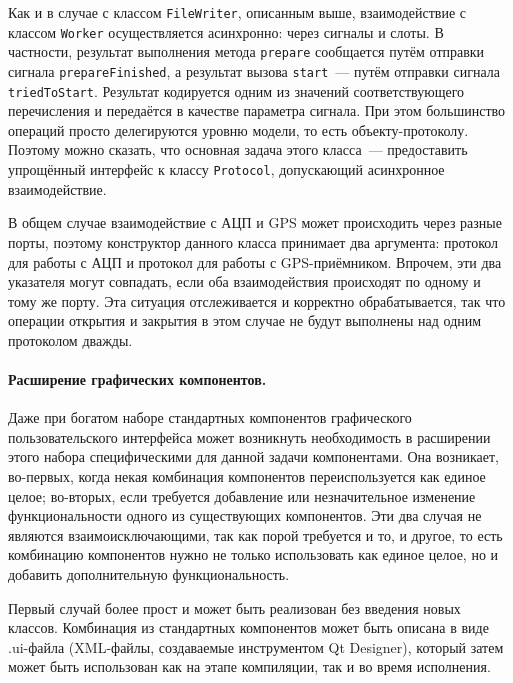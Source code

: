 \documentclass[a4paper, 14pt, titlepage]{extarticle}
\newcommand{\inlinecode}[1]{\lstinline[basicstyle=\ttfamily]{#1}}
\newcommand{\eng}[1]{\foreignlanguage{english}{#1}}
\begin{document}
  Как и в случае с классом \inlinecode{FileWriter}, описанным выше, взаимодействие с классом
  \inlinecode{Worker} осуществляется асинхронно: через сигналы и слоты. В частности, результат
  выполнения метода \inlinecode{prepare} сообщается путём отправки сигнала
  \inlinecode{prepareFinished}, а результат вызова \inlinecode{start}~--- путём отправки сигнала
  \inlinecode{triedToStart}. Результат кодируется одним из значений соответствующего перечисления и
  передаётся в качестве параметра сигнала. При этом большинство операций просто делегируются уровню
  модели, то есть объекту-протоколу. Поэтому можно сказать, что основная задача этого класса~---
  предоставить упрощённый интерфейс к классу \inlinecode{Protocol}, допускающий асинхронное
  взаимодействие.

  В общем случае взаимодействие с АЦП и GPS может происходить через разные порты, поэтому конструктор
  данного класса принимает два аргумента: протокол для работы с АЦП и протокол для работы с
  GPS-приёмником. Впрочем, эти два указателя могут совпадать, если оба взаимодействия происходят по одному и
  тому же порту. Эта ситуация отслеживается и корректно обрабатывается, так что операции открытия и
  закрытия в этом случае не будут выполнены над одним протоколом дважды.

  \paragraph{Расширение графических компонентов.}
  Даже при богатом наборе стандартных компонентов графического пользовательского интерфейса может
  возникнуть необходимость в расширении этого набора специфическими для данной задачи компонентами.
  Она возникает, во-первых, когда некая комбинация компонентов переиспользуется как единое целое;
  во-вторых, если требуется добавление или незначительное изменение функциональности одного из
  существующих компонентов. Эти два случая не являются взаимоисключающими, так как порой
  требуется и то, и другое, то есть комбинацию компонентов нужно не только использовать как единое
  целое, но и добавить дополнительную функциональность.

  Первый случай более прост и может быть реализован без введения новых классов. Комбинация из
  стандартных компонентов может быть описана в виде .ui-файла (XML-файлы, создаваемые инструментом
  \eng{Qt Designer}), который затем может быть использован как на этапе компиляции, так и во время
  исполнения.
\end{document}
